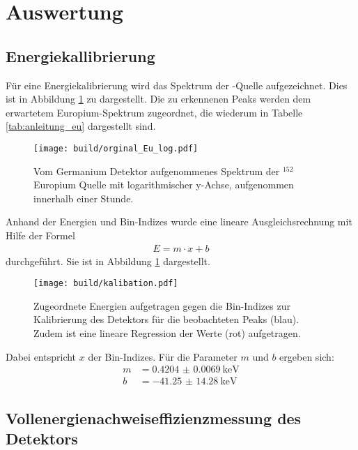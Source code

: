 \newpage
\section{Auswertung}
\label{sec:Auswertung}

\subsection{Energiekallibrierung}
\label{sec:Energiekallibrierung}

Für eine Energiekalibrierung wird das Spektrum der -Quelle
aufgezeichnet. Dies ist in Abbildung \ref{plt:Eu-Spektrum} zu dargestellt. Die zu
erkennenen Peaks werden dem erwartetem Europium-Spektrum zugeordnet,
die wiederum in Tabelle \ref{tab:anleitung_eu} dargestellt sind.
\begin{figure}[htb]
    \centering
    \texttt{[image: build/orginal\_Eu\_log.pdf]}
  \caption{Vom Germanium Detektor aufgenommenes Spektrum der $^{152}$Europium Quelle mit
  logarithmischer y-Achse, aufgenommen innerhalb einer Stunde.}
  \label{plt:Eu-Spektrum}
\end{figure}
Anhand der Energien und Bin-Indizes wurde eine lineare Ausgleichsrechnung
mit Hilfe der Formel
\begin{align*}
  E = m \cdot x + b
\end{align*}
durchgeführt. Sie ist in Abbildung \ref{plt:Eu-Spektrum} dargestellt.
\begin{figure}[htb]
  \centering
  \texttt{[image: build/kalibation.pdf]}
  \caption{Zugeordnete Energien aufgetragen gegen die Bin-Indizes zur
  Kalibrierung des Detektors für die beobachteten Peaks (blau). Zudem ist eine
  lineare Regression der Werte (rot) aufgetragen.}
  \label{plt:eichung}
\end{figure}
Dabei entspricht $x$ der Bin-Indizes. Für die Parameter $m$ und
$b$ ergeben sich:
\begin{align*}
	m &= \SI{0.4204(69)}{\kilo\electronvolt} \\
  b &= \SI{-41.25(1428)}{\kilo\electronvolt}
\end{align*}

\FloatBarrier

\subsection{Vollenergienachweiseffizienzmessung des Detektors}
\label{sec:Effizienzmessung}

